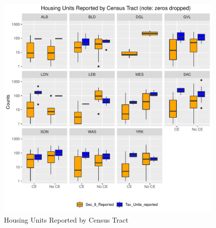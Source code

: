 \documentclass{article}\usepackage[]{graphicx}\usepackage[]{color}
\makeatletter
\def\maxwidth{ %
  \ifdim\Gin@nat@width>\linewidth
    \linewidth
  \else
    \Gin@nat@width
  \fi
}
\newenvironment{knitrout}{}{} %
\makeatother
\begin{document}
\begin{knitrout}
\color{fgcolor}\begin{figure}
\includegraphics[width=\maxwidth]{figure/BoxPlot_All_Units-1} \caption[Housing Units Reported by Census Tract]{Housing Units Reported by Census Tract}\label{fig:BoxPlot_All_Units}
\end{figure}


\end{knitrout}

\pagebreak
\newpage
\FloatBarrier
\end{document}
